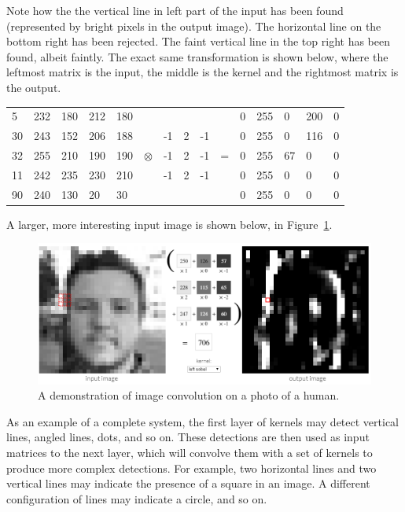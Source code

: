 Note how the the vertical line in left part of the input has been found (represented by bright pixels in the output image). The horizontal line on the bottom right has been rejected. The faint vertical line in the top right has been found, albeit faintly. The exact same transformation is shown below, where the leftmost matrix is the input, the middle is the kernel and the rightmost matrix is the output.

\begin{table}[h!]
	\centering
	\begin{tabular}{ p{0.5cm} p{0.5cm} p{0.5cm} p{0.5cm} p{0.5cm} p{0.5cm} p{0.5cm} p{0.5cm} p{0.5cm} p{0.5cm} p{0.5cm} p{0.5cm} p{0.5cm} p{0.5cm} p{0.5cm}}
		 5 & 232 & 180 & 212 & 180 &           &    &   &    &   & 0 & 255 & 0 & 200 & 0 \\
		30 & 243 & 152 & 206 & 188 &           & -1 & 2 & -1 &   & 0 & 255 & 0 & 116 & 0 \\
		32 & 255 & 210 & 190 & 190 & $\otimes$ & -1 & 2 & -1 & = & 0 & 255 & 67 & 0  & 0 \\
		11 & 242 & 235 & 230 & 210 &           & -1 & 2 & -1 &   & 0 & 255 & 0 &  0  & 0 \\
		90 & 240 & 130 &  20 &  30 &           &    &   &    &   & 0 & 255 & 0 &  0  & 0
	\end{tabular}
\end{table}

A larger, more interesting input image is shown below, in Figure~\ref{fig:image_kernel_demo}.

\begin{figure}[h!]
  \centering
  \includegraphics[width=\textwidth]{literature_review/image_kernel_demo}
  \caption{\label{fig:image_kernel_demo} A demonstration of image convolution on a photo of a human.}
\end{figure}

As an example of a complete system, the first layer of kernels may detect vertical lines, angled lines, dots, and so on. These detections are then used as input matrices to the next layer, which will convolve them with a set of kernels to produce more complex detections. For example, two horizontal lines and two vertical lines may indicate the presence of a square in an image. A different configuration of lines may indicate a circle, and so on.

